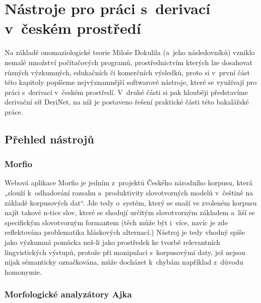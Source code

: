 \hypertarget{nuxe1stroje-pro-pruxe1ci-s-derivacuxed-v-ux10deskuxe9m-prostux159eduxed}{%
\chapter{Nástroje pro práci s~derivací v~českém
prostředí}\label{nuxe1stroje-pro-pruxe1ci-s-derivacuxed-v-ux10deskuxe9m-prostux159eduxed}}

Na základě onomaziologické teorie Miloše Dokulila (a~jeho následovníků)
vzniklo nemalé množství počítačových programů, prostřednictvím kterých
lze dosahovat různých výzkumných, edukačních či komerčních výsledků,
proto si v~první část této kapitoly popíšeme nejvýznamnější softwarové
nástroje, které se využívají pro práci s~derivací v~českém prostředí.
V~druhé části si pak hlouběji představíme derivační síť DeriNet, na níž je
postaveno řešení praktické části této bakalářské práce.

\hypertarget{pux159ehled-nuxe1strojux16f}{%
\section{Přehled nástrojů}\label{pux159ehled-nuxe1strojux16f}}

\hypertarget{morfio}{%
\subsection{Morfio}\label{morfio}}

Webová aplikace Morfio je jedním z~projektů Českého národního korpusu,
která „slouží k~odhadování rozsahu a~produktivity slovotvorných modelů
v~češtině na základě korpusových dat``. Jde tedy o~systém, který se snaží
ve zvoleném korpusu najít takové n-tice slov, které se shodují určitým
slovotvorným základem a~liší se specifickým slovotvorným formantem (těch
může být i~více, navíc je zde reflektována problematika hláskových
alternací.) Nástroj je tedy vhodný spíše jako výzkumná pomůcka než-li
jako prostředek ke tvorbě relevantních lingvistických výstupů, protože
při manipulaci s~korpusovými daty, jež nejsou nijak sémanticky
označkována, může docházet k~chybám například z~důvodu homonymie.
\parencite{cvrcek13}

\hypertarget{morfologickuxe9-analyzuxe1tory-ajka}{%
\subsection{Morfologické analyzátory
Ajka}\label{morfologickuxe9-analyzuxe1tory-ajka}}

